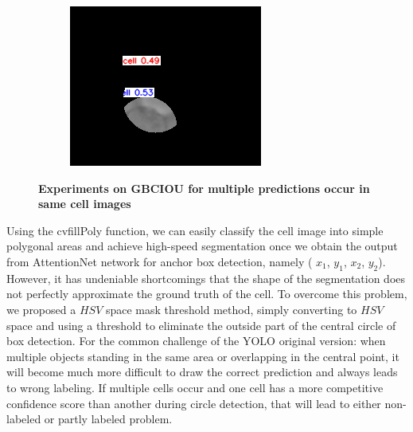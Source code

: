 \begin{figure}[h]
\begin{center}
\begin{subfigure}[b]{0.25\textwidth}
		\end{subfigure}
		\begin{subfigure}[b]{0.25\textwidth}
		    \centering
			\includegraphics[width=\textwidth]{thesis-template-master/images/gbciou12.png}
			\caption{}
			\label{fig:cellnet}
		\end{subfigure}
	\end{center}
	\caption{\textbf{Experiments on GBCIOU for multiple predictions occur in same cell images}}
\end{figure}

Using the cvfillPoly function, we can easily classify the cell image into simple polygonal areas and achieve high-speed segmentation once we obtain the output from AttentionNet network for anchor box detection, namely ( $x_{1}$, $y_{1}$, $x_{2}$, $y_{2}$). However, it has undeniable shortcomings that the shape of the segmentation does not perfectly approximate the ground truth of the cell. To overcome this problem, we proposed a $ HSV $ space mask threshold method, simply converting to $ HSV $ space and using a threshold to eliminate the outside part of the central circle of box detection.  For the common challenge of the YOLO original version: when multiple objects standing in the same area or overlapping in the central point, it will become much more difficult to draw the correct prediction and always leads to wrong labeling. If multiple cells occur and one cell has a more competitive confidence score than another during circle detection, that will lead to either non-labeled or partly labeled problem.

